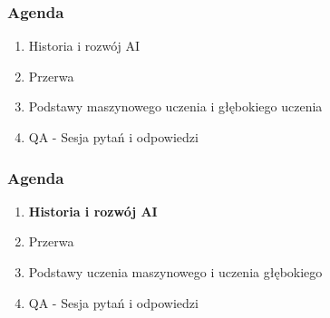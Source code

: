 \documentclass[smaller]{beamer}
\begin{document}

\begin{frame}
\frametitle{Agenda}
\begin{enumerate}
    \item Historia i rozwój AI 
    \item Przerwa 
    \item Podstawy maszynowego uczenia i głębokiego uczenia
    \item QA - Sesja pytań i odpowiedzi 
\end{enumerate}
\end{frame}


\begin{frame}
\frametitle{Agenda}
\begin{enumerate}
    \item \textbf{\color{black}Historia i rozwój AI}
    \item \color{gray}Przerwa
    \item \color{gray}Podstawy uczenia maszynowego i uczenia głębokiego
    \item \color{gray}QA - Sesja pytań i odpowiedzi
\end{enumerate}
\end{frame}

\end{document}
